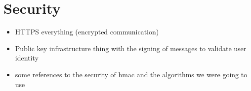 \section{Security}
\begin{itemize}
	\item HTTPS everything (encrypted communication)
	\item Public key infrastructure thing with the signing of messages to validate user identity
	\item some references to the security of hmac and the algorithms we were going to use
\end{itemize}





